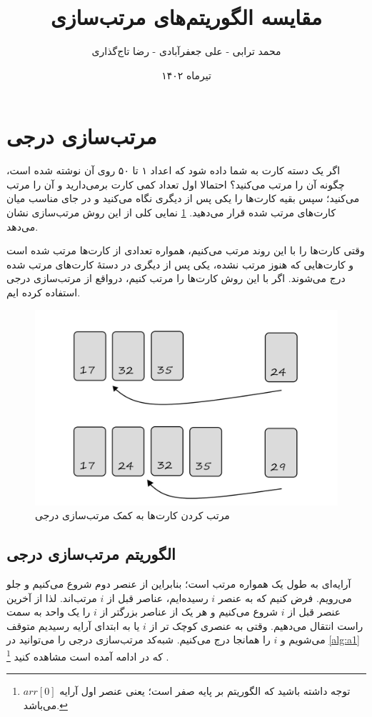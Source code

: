 \documentclass[12pt]{article}
\title{مقایسه الگوریتم‌های مرتب‌سازی}
\author{محمد ترابی - علی جعفر‌آبادی - رضا تاج‌گذاری}
\date{تیرماه ۱۴۰۲}
\begin{document}
\maketitle

\pagebreak

\section{مرتب‌سازی درجی\protect{}}

اگر یک دسته کارت به شما داده شود که اعداد ۱ تا ۵۰ روی آن نوشته شده است، چگونه آن را مرتب
می‌کنید؟
احتمالا اول تعداد کمی کارت برمی‌دارید و آن را مرتب می‌کنید؛
سپس بقیه کارت‌ها را یکی پس از دیگری نگاه می‌کنید
و در جای مناسب میان کارت‌های مرتب شده قرار می‌دهید.
\cref{fig:f1}
نمایی کلی از این روش مرتب‌سازی نشان می‌دهد.

وقتی کارت‌ها را با این روند مرتب می‌کنیم،
همواره تعدادی از کارت‌ها مرتب شده است و کارت‌هایی که هنوز مرتب نشده، یکی پس از دیگری
در دستهٔ کارت‌های مرتب شده درج
می‌شوند.
اگر با این روش کارت‌ها را مرتب کنیم، درواقع از مرتب‌سازی درجی استفاده کرده ایم.

\begin{figure}[H]
  \centering
  \includegraphics[width=.8\textwidth]{figs/sortingCards2.jpg}
  \caption{
    مرتب کردن کارت‌ها به کمک مرتب‌سازی درجی
  }
  \label{fig:f1}
\end{figure}

\subsection*{الگوریتم مرتب‌سازی درجی}
آرایه‌ای به طول یک همواره مرتب است؛ بنابراین از عنصر دوم شروع می‌کنیم و جلو می‌رویم.
فرض کنیم که به عنصر
$i$
رسیده‌ایم،
عناصر قبل از
$i$
مرتب‌اند.
لذا از آخرین عنصر قبل از
$i$
شروع می‌کنیم و
هر یک از عناصر بزرگتر از
$i$
را یک واحد به سمت راست انتقال
می‌دهیم.
وقتی به عنصری کوچک تر از
$i$
یا به ابتدای آرایه رسیدیم
متوقف می‌شویم و
$i$
را همانجا درج
می‌کنیم.
شبه‌کد مرتب‌سازی درجی را می‌توانید در
\cref{alg:a1}
که در ادامه آمده است
مشاهده کنید
\footnote{
  توجه داشته باشید که الگوریتم بر پایه صفر است؛ یعنی عنصر اول آرایه
  $arr[0]$
  می‌باشد.
}
.
\end{document}
